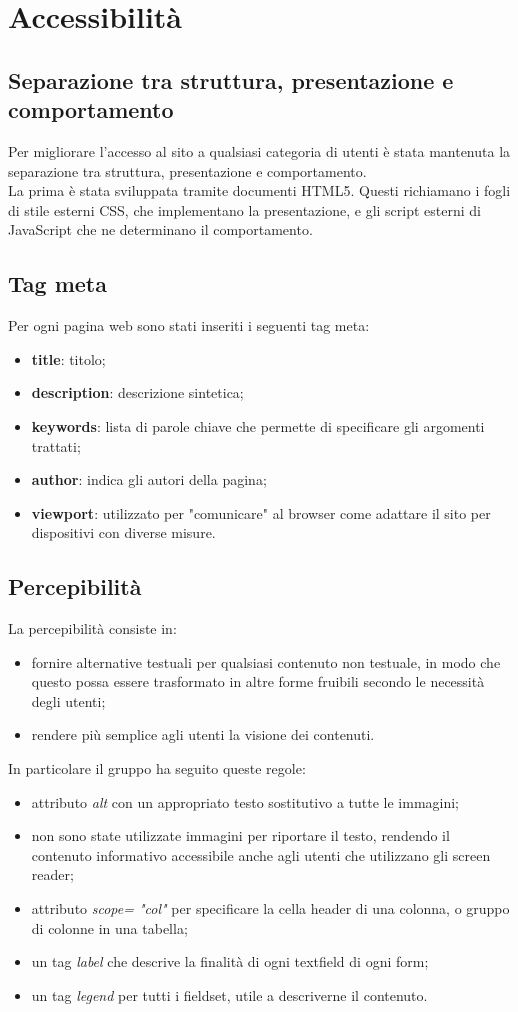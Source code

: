 \section{Accessibilità}
\subsection{Separazione tra struttura, presentazione e comportamento}
Per migliorare l'accesso al sito a qualsiasi categoria di utenti è stata mantenuta la separazione tra struttura, presentazione e comportamento. \\
La prima è stata sviluppata tramite documenti HTML5. Questi richiamano i fogli di stile esterni CSS, che implementano la presentazione, e gli script esterni di JavaScript che ne determinano il comportamento.
\subsection{Tag meta}
Per ogni pagina web sono stati inseriti i seguenti tag meta:
\begin{itemize}
	\item \textbf{title}: titolo;
	\item \textbf{description}: descrizione sintetica;
	\item \textbf{keywords}: lista di parole chiave che permette di specificare gli argomenti trattati;
	\item \textbf{author}: indica gli autori della pagina;
	\item \textbf{viewport}: utilizzato per "comunicare" al browser come adattare il sito per dispositivi con diverse misure.
\end{itemize}


\subsection{Percepibilità}
La percepibilità consiste in: 
	\begin{itemize}
		\item fornire alternative testuali per qualsiasi contenuto non testuale, in modo che questo possa essere trasformato in altre forme fruibili secondo le necessità degli utenti;
		\item rendere più semplice agli utenti la visione dei contenuti.
	\end{itemize}
	In particolare il gruppo ha seguito queste regole:
	\begin{itemize}
		\item attributo \textit{alt} con un appropriato testo sostitutivo a tutte le immagini;
		\item non sono state utilizzate immagini per riportare il testo, rendendo il contenuto informativo accessibile anche agli utenti che utilizzano gli screen reader;
		\item attributo \textit{scope= "col"} per specificare la cella header di una colonna, o gruppo di colonne in una tabella;
		\item un tag \textit{label} che descrive la finalità di ogni textfield di ogni form;
		\item un tag \textit{legend} per tutti i fieldset, utile a descriverne il contenuto.
	\end{itemize}
